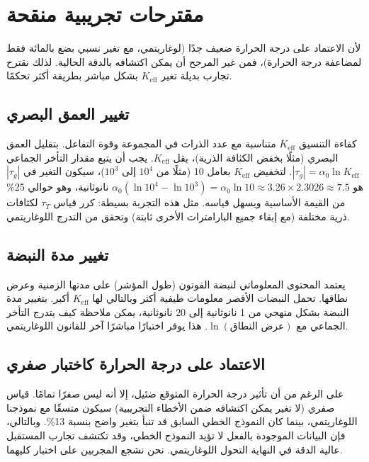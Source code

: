 \documentclass[12pt,a4paper]{article}
\newcommand{\Keff}{K_{\mathrm{eff}}}
\begin{document}
	\section{مقترحات تجريبية منقحة}
	
	لأن الاعتماد على درجة الحرارة ضعيف جدًا (لوغاريتمي، مع تغير نسبي بضع بالمائة فقط لمضاعفة درجة الحرارة)، فمن غير المرجح أن يمكن اكتشافه بالدقة الحالية. لذلك نقترح تجارب بديلة تغير \(\Keff\) بشكل مباشر بطريقة أكثر تحكمًا.
	
	\subsection{تغيير العمق البصري}
	
	كفاءة التنسيق \(\Keff\) متناسبة مع عدد الذرات في المجموعة وقوة التفاعل. بتقليل العمق البصري (مثلًا بخفض الكثافة الذرية)، يقل \(\Keff\). يجب أن يتبع مقدار التأخر الجماعي \(|\tau_g| = \alpha_0 \ln\Keff\). لتخفيض \(\Keff\) بعامل 10 (مثلًا من \(10^4\) إلى \(10^3\))، سيكون التغير في \(|\tau_g|\) هو \(\alpha_0 (\ln 10^4 - \ln 10^3) = \alpha_0 \ln 10 \approx 3.26 \times 2.3026 \approx 7.5\) نانوثانية، وهو حوالي 25\% من القيمة الأساسية ويسهل قياسه. مثل هذه التجربة بسيطة: كرر قياس \(\tau_T\) لكثافات ذرية مختلفة (مع إبقاء جميع البارامترات الأخرى ثابتة) وتحقق من التدرج اللوغاريتمي.
	
	\subsection{تغيير مدة النبضة}
	
	يعتمد المحتوى المعلوماتي لنبضة الفوتون (طول المؤشر) على مدتها الزمنية وعرض نطاقها. تحمل النبضات الأقصر معلومات طيفية أكثر وبالتالي لها \(\Keff\) أكبر. بتغيير مدة النبضة بشكل منهجي من 1 نانوثانية إلى 20 نانوثانية، يمكن ملاحظة كيف يتدرج التأخر الجماعي مع \(\ln(\text{عرض النطاق})\). هذا يوفر اختبارًا مباشرًا آخر للقانون اللوغاريتمي.
	
	\subsection{الاعتماد على درجة الحرارة كاختبار صفري}
	
	على الرغم من أن تأثير درجة الحرارة المتوقع ضئيل، إلا أنه ليس صفرًا تمامًا. قياس صفري (لا تغير يمكن اكتشافه ضمن الأخطاء التجريبية) سيكون متسقًا مع نموذجنا اللوغاريتمي، بينما كان النموذج الخطي السابق قد تنبأ بتغير واضح بنسبة 13\%. وبالتالي، فإن البيانات الموجودة بالفعل لا تؤيد النموذج الخطي، وقد تكتشف تجارب المستقبل عالية الدقة في النهاية التحول اللوغاريتمي. نحن نشجع المجربين على اختبار كليهما.
	
\end{document}
